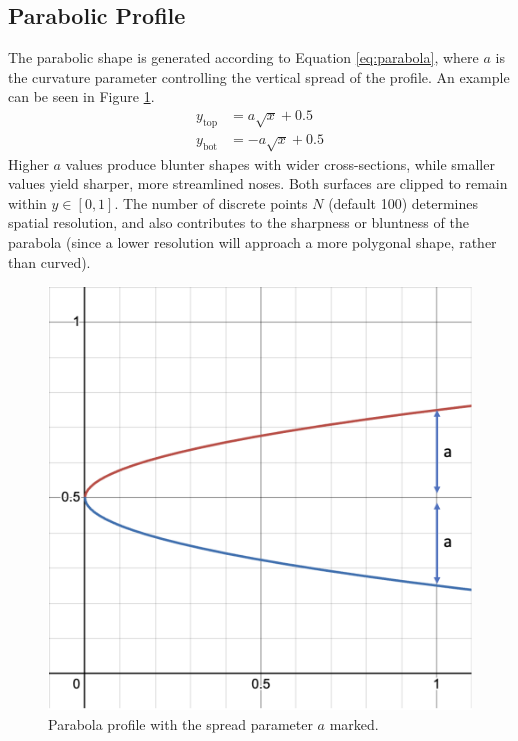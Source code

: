 \documentclass[11pt]{article}
\begin{document}
\subsection{Parabolic Profile}
The parabolic shape is generated according to Equation \ref{eq:parabola}, where $a$ is the curvature parameter controlling the vertical spread of the profile. An example can be seen in Figure \ref{fig:parabola}.
\begin{subequations} \label{eq:parabola}
\begin{align}
y_{\text{top}} &= a\sqrt{x} + 0.5 \label{eq:parabola_top}\\
y_{\text{bot}} &= -a\sqrt{x} + 0.5 \label{eq:parabola_bot}
\end{align}
\end{subequations}
Higher $a$ values produce blunter shapes with wider cross-sections, while smaller values yield sharper, more streamlined noses. Both surfaces are clipped to remain within $y \in [0,1]$. The number of discrete points $N$ (default 100) determines spatial resolution, and also contributes to the sharpness or bluntness of the parabola (since a lower resolution will approach a more polygonal shape, rather than curved).
\begin{figure}[H]
\centering
    \includegraphics[width=0.5\linewidth]{parabola.png}
    \caption{Parabola profile with the spread parameter $a$ marked.}
\label{fig:parabola}
\end{figure}
\end{document}

